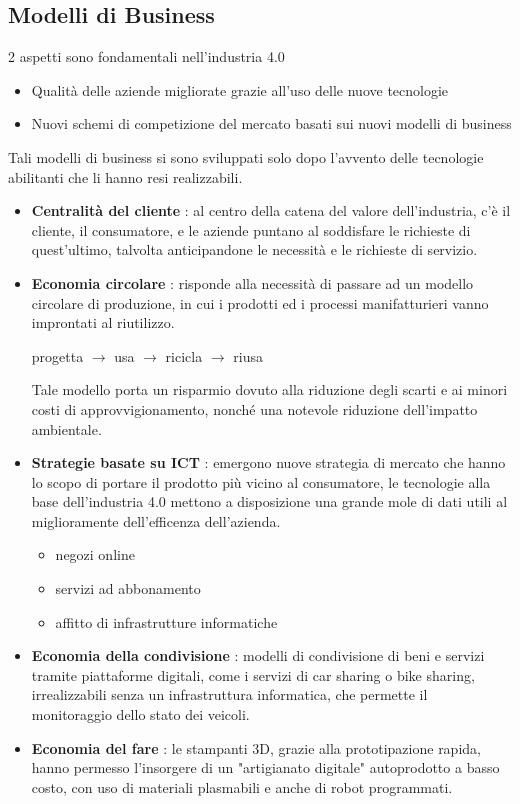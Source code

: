 \documentclass[10pt, letterpaper]{report}
\begin{document}
\subsection{Modelli di Business}
2 aspetti sono fondamentali nell'industria 4.0\begin{itemize}
    \item Qualità delle aziende migliorate grazie all'uso delle nuove tecnologie 
    \item Nuovi schemi di competizione del mercato basati sui nuovi modelli di business 
\end{itemize}
Tali modelli di business si sono sviluppati solo dopo l'avvento delle tecnologie abilitanti che li hanno resi 
realizzabili.\begin{itemize}
    \item \textbf{Centralità del cliente} : al centro della catena del valore dell'industria, c'è il cliente, il 
    consumatore, e le aziende puntano al soddisfare le richieste di quest'ultimo, talvolta anticipandone le necessità e le 
    richieste di servizio.
    \item \textbf{Economia circolare} : risponde alla necessità di passare ad un modello circolare di produzione, in 
    cui i prodotti ed i processi manifatturieri vanno improntati al riutilizzo.\begin{center}
        progetta $\longrightarrow$ usa $\longrightarrow$ ricicla $\longrightarrow$ riusa
    \end{center}
    Tale modello porta un risparmio dovuto alla riduzione degli scarti e ai minori costi di approvvigionamento, nonché 
    una notevole riduzione dell'impatto ambientale.
    \item \textbf{Strategie basate su ICT} : emergono nuove strategia di mercato che hanno lo scopo di portare il prodotto 
    più vicino al consumatore, le tecnologie alla base dell'industria 4.0 mettono a disposizione una grande mole di dati 
    utili al miglioramente dell'efficenza dell'azienda. \begin{itemize}
        \item negozi online 
        \item servizi ad abbonamento 
        \item affitto di infrastrutture informatiche 
    \end{itemize}
    \item \textbf{Economia della condivisione} : modelli di condivisione di beni e servizi tramite piattaforme digitali, come 
    i servizi di car sharing o bike sharing, irrealizzabili senza un infrastruttura informatica, che permette il monitoraggio 
    dello stato dei veicoli.
    \item \textbf{Economia del fare} : le stampanti 3D, grazie alla prototipazione rapida, hanno permesso l'insorgere di un "artigianato digitale" 
    autoprodotto a basso costo, con uso di materiali  plasmabili e anche di robot programmati.
\end{itemize}
\end{document}

